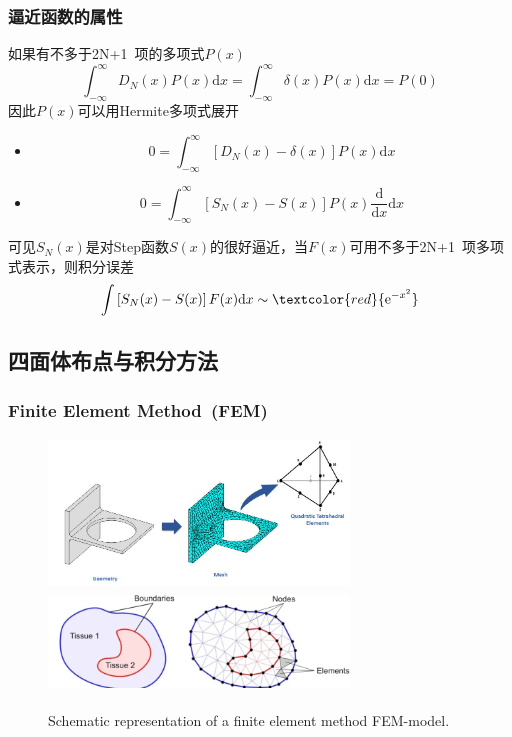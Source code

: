 {\frame
{
	\frametitle{逼近函数的属性}
	如果有不多于\textrm{2N+1~}项的多项式$P(x)$
	\begin{displaymath}
		\int_{-\infty}^{\infty}D_N(x)P(x)\mathrm{d}x=\int_{-\infty}^{\infty}\delta(x)P(x)\mathrm{d}x=P(0)
	\end{displaymath}
	因此$P(x)$可以用\textrm{Hermite}多项式展开
\begin{itemize}
	\item \begin{displaymath}
			0=\int_{-\infty}^{\infty}\left[D_N(x)-\delta(x)\right]P(x)\mathrm{d}x
	\end{displaymath}
	\item \begin{displaymath}
			0=\int_{-\infty}^{\infty}\left[S_N(x)-S(x)\right]P(x)\frac{{\mathrm d}}{\mathrm dx}\mathrm{d}x
	\end{displaymath}
\end{itemize}
可见$S_N(x)$是对\textrm{Step}函数$S(x)$的很好逼近，当$F(x)$可用不多于\textrm{2N+1~}项多项式表示，则积分误差
$$\int\left[S_N(x)-S(x)\right]F(x)\mathrm{d}x\sim\textcolor{red}{\mathrm{e}^{-x^2}}$$
}

\subsection{四面体布点与积分方法}
\frame
{
	\frametitle{\rm{Finite Element Method~(FEM)}}
\begin{figure}[h!]
\centering
\vspace*{-0.25in}
	\includegraphics[height=1.55in,width=3.15in,viewport=30 0 900 500,clip]{Figures/Finite_element_analysis.jpg}
	\vskip 2pt
	\includegraphics[height=1.05in,width=3.15in,viewport=0 0 850 285,clip]{Figures/Schematic-representation-of-a-finite_element_method-FEM-model.png}
	\caption{\tiny \textrm{Schematic representation of a finite element method FEM-model.}}%
\label{Fig:FEM}
\end{figure}
}

}

